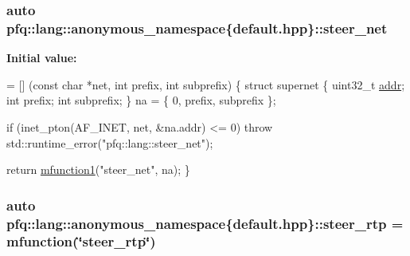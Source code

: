 \hypertarget{namespacepfq_1_1lang_1_1anonymous__namespace_02default_8hpp_03_a6f8d514e40bb2b0e874fb26d2b416dc3}{
\subsubsection[{steer\+\_\+net}]{\setlength{\rightskip}{0pt plus 5cm}auto pfq\+::lang\+::anonymous\+\_\+namespace\{default.\+hpp\}\+::steer\+\_\+net}}\label{namespacepfq_1_1lang_1_1anonymous__namespace_02default_8hpp_03_a6f8d514e40bb2b0e874fb26d2b416dc3}
{\bfseries Initial value\+:}
\begin{DoxyCode}
= [] (\textcolor{keyword}{const} \textcolor{keywordtype}{char} *net, \textcolor{keywordtype}{int} prefix, \textcolor{keywordtype}{int} subprefix)
        \{
            \textcolor{keyword}{struct }supernet \{
                uint32\_t \hyperlink{namespacepfq_1_1lang_1_1anonymous__namespace_02default_8hpp_03_a13cabe468839119d8d68540e3c60718b}{addr};
                \textcolor{keywordtype}{int}      prefix;
                \textcolor{keywordtype}{int}      subprefix;
            \} na = \{ 0, prefix, subprefix \};

            \textcolor{keywordflow}{if} (inet\_pton(AF\_INET, net, &na.addr) <= 0)
                \textcolor{keywordflow}{throw} std::runtime\_error(\textcolor{stringliteral}{"pfq::lang::steer\_net"});

            \textcolor{keywordflow}{return} \hyperlink{namespacepfq_1_1lang_a68d775c68562fbd0ab9ef213f2519499}{mfunction1}(\textcolor{stringliteral}{"steer\_net"}, na);
        \}
\end{DoxyCode}
\hypertarget{namespacepfq_1_1lang_1_1anonymous__namespace_02default_8hpp_03_ac3bc5ec07d93fa5d9266e0e08191fe22}{
\subsubsection[{steer\+\_\+rtp}]{\setlength{\rightskip}{0pt plus 5cm}auto pfq\+::lang\+::anonymous\+\_\+namespace\{default.\+hpp\}\+::steer\+\_\+rtp = {\bf mfunction}(\char`\"{}steer\+\_\+rtp\char`\"{})}}\label{namespacepfq_1_1lang_1_1anonymous__namespace_02default_8hpp_03_ac3bc5ec07d93fa5d9266e0e08191fe22}
